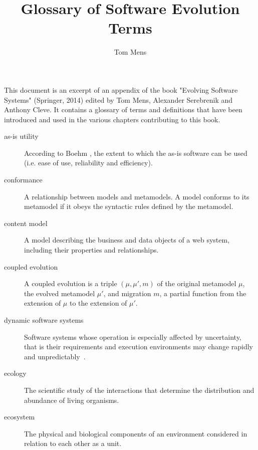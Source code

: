 \documentclass[11pt, oneside]{article}
\title{Glossary of Software Evolution Terms}
\author{Tom Mens}
\begin{document}
\maketitle




This document is an excerpt of an appendix of the book "Evolving Software Systems" (Springer, 2014) edited by Tom Mens, Alexander Serebrenik and Anthony Cleve. It contains a glossary of terms and definitions that have been introduced and used in the various chapters contributing to this book.

\begin{description}

\item[as-is utility]
According to Boehm \cite{opac-b1104886}, the extent to which the as-is software can be used (i.e. ease of use, reliability and efficiency).



\item[conformance]
A relationship between models and metamodels. A model conforms to its metamodel if it obeys the syntactic rules defined by the metamodel.

\item[content model]
A model describing the business and data objects of a web system, including their properties and relationships.

\item[coupled evolution]
A coupled evolution is a triple $(\mu, \mu', m)$ of the original metamodel $\mu$, the evolved metamodel $\mu'$, and migration $m$, a partial function from the extension of $\mu$ to the extension of $\mu'$.


\item[dynamic software systems]
Software systems whose operation is especially affected by uncertainty, that is their requirements and execution environments may change rapidly and unpredictably~\cite{Northrop:ULSReport:SEI:2006}.


\item[ecology]
The scientific study of the interactions that determine the distribution and abundance of living organisms.

\item[ecosystem]
The physical and biological components of an environment considered in relation to each other as a unit.


\end{description}
\end{document}
